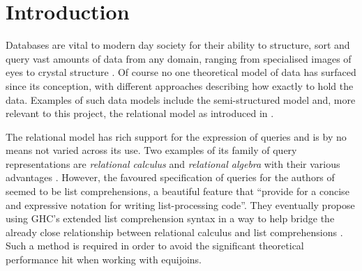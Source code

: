 \chapter{Introduction} %
\begin{comment}
It’s a good idea to *try* to write the introduction to your final report early on in the project. However, you will find it hard, as you won’t yet have a complete story and you won’t know what your main contributions are going to be. However, the exercise is useful as it will tell you what you *don’t* yet know and thus what questions your project should aim to answer. For the interim report this section should be a short, succinct, summary of the project’s main objectives. Some of this material may be re-usable in your final report, but the chances are that your final introduction will be quite different.  You are therefore advised to keep this part of the interim report short, focusing on the following questions: What is the problem, why is it interesting and what’s your main idea for solving it?  (DON'T use those three questions as subheadings however!  The answers should emerge from what you write.)
\end{comment}

Databases are vital to modern day society for their ability to structure, sort and query vast amounts of data from any domain, ranging from specialised images of eyes  to crystal structure \cite{CambridgeStructuralDatabase}. Of course no one theoretical model of data has surfaced since its conception, with different approaches describing how exactly to hold the data. Examples of such data models include the semi-structured model \cite{DatabaseSystems} and, more relevant to this project, the relational model \cite{RelationalModel} as introduced in .

The relational model has rich support for the expression of queries and is by no means not varied across its use. Two examples of its family of query representations are \emph{relational calculus} and \emph{relational algebra} with their various advantages \cite{RelationalCalculus,RelationalModel}.  However, the favoured specification of queries for the authors of \cite{RelationalAlgebraByWayOfAdjunctions} seemed to be list comprehensions, a beautiful feature that ``provide for a concise and expressive notation for writing list-processing code''. \cite{MonadComprehensions} They eventually propose using GHC's extended list comprehension syntax in a way to help bridge the already close relationship between relational calculus and list comprehensions \cite{GHCListComprehension,ComprehensiveComprehensions}. Such a method is required in order to avoid the significant theoretical performance hit when working with equijoins.

